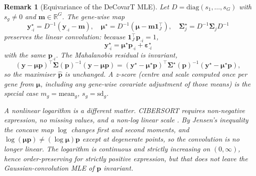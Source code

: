 \documentclass[pdflatex, sn-nature]{sn-jnl}
\theoremstyle{thmstyleone}%
\theoremstyle{thmstyletwo}%
\newtheorem{remark}{Remark}%
\theoremstyle{thmstylethree}%
\begin{document}
\begin{appendices}
\begin{remark}[Equivariance of the DeCovarT MLE]
            Let \(D=\mathrm{diag}(s_{1},\ldots,s_{G})\) with \(s_{g}\neq 0\)
            and \(\boldsymbol{m}\in\mathbb{R}^{G}\). The gene-wise map
            \begin{equation*}
                \boldsymbol{y}^{\star}_{\cdot i}
                = D^{-1}(\boldsymbol{y}_{\cdot i}-\boldsymbol{m}),
                \quad
                \boldsymbol{\mu}^{\star}
                = D^{-1}(\boldsymbol{\mu}-\boldsymbol{m}\boldsymbol{1}_{J}^{\top}),
                \quad
                \boldsymbol{\Sigma}_{j}^{\star}
                = D^{-1}\boldsymbol{\Sigma}_{j} D^{-1}
            \end{equation*}
            preserves the linear convolution: because
            \(\boldsymbol{1}_{J}^{\top}\boldsymbol{p}_{\cdot i}=1\),
            \begin{equation*}
                \boldsymbol{y}^{\star}_{\cdot i}
                =\boldsymbol{\mu}^{\star}\boldsymbol{p}_{\cdot i}
                +\boldsymbol{\varepsilon}^{\star}_{\cdot i}
            \end{equation*}
            with the same \(\boldsymbol{p}_{\cdot i}\). The Mahalanobis residual
            is invariant,
            \begin{equation*}
                (\boldsymbol{y}-\boldsymbol{\mu}\boldsymbol{p})^{\top}
                \boldsymbol{\Sigma}(\boldsymbol{p})^{-1}
                (\boldsymbol{y}-\boldsymbol{\mu}\boldsymbol{p})
                =
                (\boldsymbol{y}^{\star}-\boldsymbol{\mu}^{\star}\boldsymbol{p})^{\top}
                \boldsymbol{\Sigma}^{\star}(\boldsymbol{p})^{-1}
                (\boldsymbol{y}^{\star}-\boldsymbol{\mu}^{\star}\boldsymbol{p}),
            \end{equation*}
            so the maximiser \(\hat{\boldsymbol{p}}\) is unchanged. A z-score
            (centre and scale computed once per gene from \(\boldsymbol{\mu}\),
            including any gene-wise covariate adjustment of those means) is
            the special case \(m_{g}=\mathrm{mean}_{g}\),
            \(s_{g}=\mathrm{sd}_{g}\).

            A nonlinear logarithm is a different matter. CIBERSORT requires
            non-negative expression, no missing values, and a non-log linear
            scale \cite{newmanRobustEnumerationCell2015}. By Jensen's
            inequality the concave map \(\log\) changes first and second
            moments, and
            \(\log(\boldsymbol{\mu}\boldsymbol{p})
            \neq (\log\boldsymbol{\mu})\boldsymbol{p}\) except at degenerate points,
            so the convolution is no longer linear. The logarithm is continuous
            and strictly increasing on \((0,\infty)\), hence order-preserving
            for strictly positive expression, but that does \emph{not} leave
            the Gaussian-convolution MLE of \(\boldsymbol{p}\) invariant.
        \end{remark}


\end{appendices}
\end{document}
